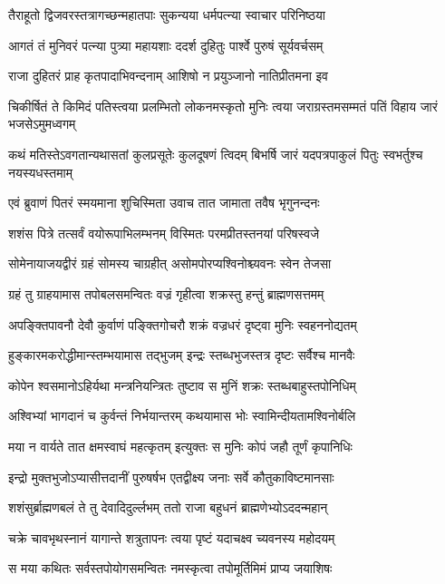 \twolineshloka
{तैराहूतो द्विजवरस्तत्रागच्छन्महातपाः}
{सुकन्यया धर्मपत्न्या स्वाचार परिनिष्ठया}%

\twolineshloka
{आगतं तं मुनिवरं पत्न्या पुत्र्या महायशाः}
{ददर्श दुहितुः पार्श्वे पुरुषं सूर्यवर्चसम्}%

\twolineshloka
{राजा दुहितरं प्राह कृतपादाभिवन्दनाम्}
{आशिषो न प्रयुञ्जानो नातिप्रीतमना इव}%

\fourlineindentedshloka
{चिकीर्षितं ते किमिदं पतिस्त्वया}
{प्रलम्भितो लोकनमस्कृतो मुनिः}
{त्वया जराग्रस्तमसम्मतं पतिं}
{विहाय जारं भजसेऽमुमध्वगम्}%

\twolineshloka
{कथं मतिस्तेऽवगतान्यथासतां कुलप्रसूतेः कुलदूषणं त्विदम्}
{बिभर्षि जारं यदपत्रपाकुलं पितुः स्वभर्तुश्च नयस्यधस्तमाम्}%

\twolineshloka
{एवं ब्रुवाणं पितरं स्मयमाना शुचिस्मिता}
{उवाच तात जामाता तवैष भृगुनन्दनः}%

\twolineshloka
{शशंस पित्रे तत्सर्वं वयोरूपाभिलम्भनम्}
{विस्मितः परमप्रीतस्तनयां परिषस्वजे}%

\twolineshloka
{सोमेनायाजयद्वीरं ग्रहं सोमस्य चाग्रहीत्}
{असोमपोरप्यश्विनोश्च्यवनः स्वेन तेजसा}%

\twolineshloka
{ग्रहं तु ग्राहयामास तपोबलसमन्वितः}
{वज्रं गृहीत्वा शक्रस्तु हन्तुं ब्राह्मणसत्तमम्}%

\twolineshloka
{अपङ्क्तिपावनौ देवौ कुर्वाणं पङ्क्तिगोचरौ}
{शक्रं वज्रधरं दृष्ट्वा मुनिः स्वहननोद्यतम्}%

\twolineshloka
{हुङ्कारमकरोद्धीमान्स्तम्भयामास तद्भुजम्}
{इन्द्रः स्तब्धभुजस्तत्र दृष्टः सर्वैश्च मानवैः}%

\twolineshloka
{कोपेन श्वसमानोऽहिर्यथा मन्त्रनियन्त्रितः}
{तुष्टाव स मुनिं शक्रः स्तब्धबाहुस्तपोनिधिम्}%

\twolineshloka
{अश्विभ्यां भागदानं च कुर्वन्तं निर्भयान्तरम्}
{कथयामास भोः स्वामिन्दीयतामश्विनोर्बलि}%

\twolineshloka
{मया न वार्यते तात क्षमस्वाघं महत्कृतम्}
{इत्युक्तः स मुनिः कोपं जहौ तूर्णं कृपानिधिः}%

\twolineshloka
{इन्द्रो मुक्तभुजोऽप्यासीत्तदानीं पुरुषर्षभ}
{एतद्वीक्ष्य जनाः सर्वे कौतुकाविष्टमानसाः}%

\twolineshloka
{शशंसुर्ब्राह्मणबलं ते तु देवादिदुर्ल्लभम्}
{ततो राजा बहुधनं ब्राह्मणेभ्योऽददन्महान्}%

\twolineshloka
{चक्रे चावभृथस्नानं यागान्ते शत्रुतापनः}
{त्वया पृष्टं यदाचक्ष्व च्यवनस्य महोदयम्}%

\twolineshloka
{स मया कथितः सर्वस्तपोयोगसमन्वितः}
{नमस्कृत्वा तपोमूर्तिमिमं प्राप्य जयाशिषः}%

